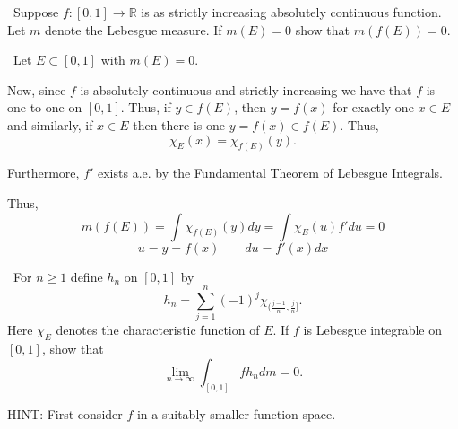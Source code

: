 \documentclass[12pt]{Homework}
\begin{document}
\begin{problem} $\,$
Suppose $f:[0,1]\to\mathbb{R}$ is as strictly increasing absolutely continuous function. Let $m$ denote the Lebesgue measure. If $m(E)=0$ show that $m(f(E))=0$.
\end{problem}


\begin{solution}$\,$
Let $E\subset[0,1]$ with $m(E)=0.$

Now, since $f$ is absolutely continuous and strictly increasing we have that $f$ is one-to-one on $[0,1]$. Thus, if $y\in f(E)$, then $y=f(x)$ for exactly one $x\in E$ and similarly, if $x\in E$ then there is one $y=f(x)\in f(E).$ Thus, $$\chi_E(x)=\chi_{f(E)}(y).$$

Furthermore, $f'$ exists a.e. by the Fundamental Theorem of Lebesgue Integrals.

Thus, $$m(f(E))=\int\chi_{f(E)}(y)dy=\int\chi_E(u)f'du=0$$ $$u=y=f(x)\qquad du=f'(x)dx$$
\end{solution}
\newpage

\begin{problem} $\,$
For $n\ge1$ define $h_n$ on $[0,1]$ by $$h_n=\sum_{j=1}^n(-1)^j\chi_{(\frac{j-1}{n},\frac{j}{n}]}.$$ Here $\chi_E$ denotes the characteristic function of $E$. If $f$ is Lebesgue integrable on $[0,1]$, show that $$\lim_{n\to\infty}\int_{[0,1]}fh_ndm=0.$$

HINT: First consider $f$ in a suitably smaller function space.
\end{problem}
\end{document}
